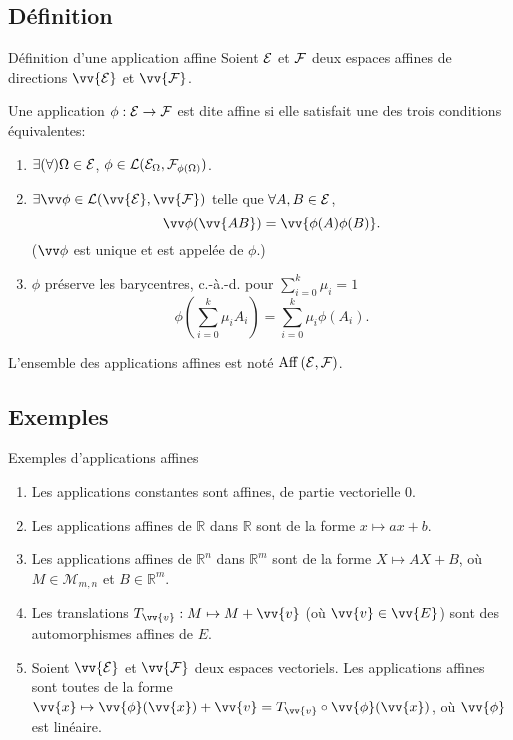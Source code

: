 \documentclass[
bigger]{m53beamer}
\begin{document}
\subsection{Définition}
  \begin{frame}{Définition d'une application affine}
    Soient $\mathcal{E}$ et $\mathcal{F}$ deux espaces affines de directions $\vv{\ens{E}}$ et $\vv{\ens{F}}$.
    \begin{defprop}
      Une application $\phi:\mathcal{E}\rightarrow\mathcal{F}$ est dite \alert{affine} si elle satisfait une des trois conditions équivalentes:
      \begin{enumerate}[<+(1)->]
        \item $\exists(\forall) \Omega \in \mathcal{E}$, $\phi\in\mathcal{L}(\mathcal{E}_{\Omega},\mathcal{F}_{\phi(\Omega)})$.
        \item $\exists \vv\phi \in \mathcal{L}(\vv{\ens{E}},\vv{\ens{F}})$ telle que $\forall A,B \in \mathcal{E}$,
          $$
            \vv\phi(\vv{AB})=\vv{\phi(A)\phi(B)}.
          $$
        ($\vv\phi$ est unique et est appelée  de $\phi$.)
        \item $\phi$ préserve les barycentres, c.-à.-d. pour $\sum_{i=0}^{k}\mu_{i}=1$
          $$
            \phi(\sum_{i=0}^{k}\mu_{i}A_{i})=\sum_{i=0}^{k}\mu_{i}\phi(A_{i}).
          $$
      \end{enumerate}\pause
      L'ensemble des applications affines est noté $\operatorname{Aff}\left(\mathcal{E},\mathcal{F}\right)$.
    \end{defprop}
  \end{frame}
\subsection{Exemples}
  \begin{frame}{Exemples d'applications affines}
    \begin{enumerate}[<+(1)->]
      \item Les applications constantes sont affines, de partie vectorielle $0$.
      \item Les applications affines de $\mathbb{R}$ dans $\mathbb{R}$ sont de la forme $x \mapsto ax+b$.
      \item Les applications affines de $\mathbb{R}^{n}$ dans $\mathbb{R}^{m}$ sont de la forme $X \mapsto AX+B$, où $M \in \mathcal{M}_{m,n}$ et $B \in \mathbb{R}^{m}$.
      \item Les translations $T_{\vv{v}}:M \mapsto M+\vv{v}$ (où $\vv{v} \in \vv{E}$) sont des automorphismes affines de $E$.
      \item Soient $\vv{\mathcal{E}}$ et $\vv{\mathcal{F}}$ deux espaces vectoriels. Les applications affines sont toutes de la forme $\vv{x} \mapsto \vv{\phi}(\vv{x}) + \vv{v}=T_{\vv{v}}\circ\vv{\phi}(\vv{x})$, où $\vv{\phi}$ est linéaire.
    \end{enumerate}
  \end{frame}
\end{document}
